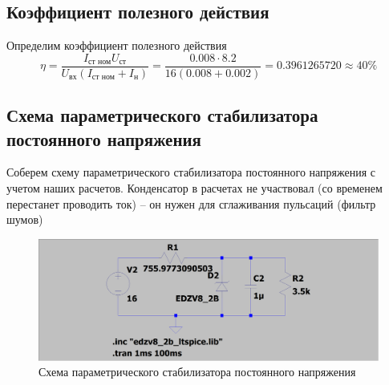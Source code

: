 \documentclass[a4paper, 12pt]{article}
\begin{document}
    \subsection{Коэффициент полезного действия}
    Определим коэффициент полезного действия
    $$
    \eta=\dfrac{I_\text{ст ном}U_{\text{ст}}}{U_{\text{вх}}\left( I_{\text{ст ном}}+I_{\text{н}} \right)}=\dfrac{0.008\cdot8.2}{16\left( 0.008+0.002 \right)}=0.3961265720\approx40\%
    $$


    \subsection{Схема параметрического стабилизатора постоянного напряжения}
    Соберем схему параметрического стабилизатора постоянного напряжения с учетом наших расчетов.
    Конденсатор в расчетах не участвовал (со временем перестанет проводить ток)
    -- он нужен для сглаживания пульсаций (фильтр шумов)
    \begin{figure}[H]
        \centering
        \includegraphics[scale=0.22]{1task_scheme_AC.png}
        \captionsetup{skip=0pt}
        \caption{Схема параметрического стабилизатора постоянного напряжения}
        \label{fig:1task_scheme_AC}
    \end{figure}
\end{document}
